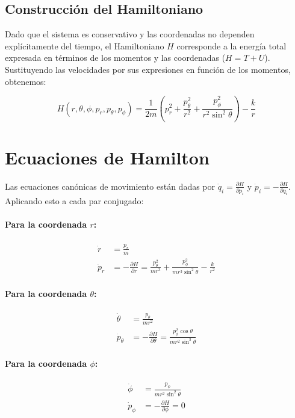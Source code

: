 \documentclass[12pt, a4paper]{article}
\begin{document}
\subsection*{Construcción del Hamiltoniano}

Dado que el sistema es conservativo y las coordenadas no dependen explícitamente del tiempo, el Hamiltoniano $H$ corresponde a la energía total expresada en términos de los momentos y las coordenadas ($H = T + U$).
Sustituyendo las velocidades por sus expresiones en función de los momentos, obtenemos:

\begin{equation}
    H(r, \theta, \phi, p_r, p_\theta, p_\phi) = \frac{1}{2m}\left( p_r^2 + \frac{p_\theta^2}{r^2} + \frac{p_\phi^2}{r^2\sin^2\theta} \right) - \frac{k}{r}
\end{equation}

\section*{Ecuaciones de Hamilton}

Las ecuaciones canónicas de movimiento están dadas por $\dot{q}_i = \frac{\partial H}{\partial p_i}$ y $\dot{p}_i = -\frac{\partial H}{\partial q_i}$. Aplicando esto a cada par conjugado:

\paragraph{Para la coordenada $r$:}
\begin{align}
    \dot{r} &= \frac{p_r}{m} \\
    \dot{p}_r &= -\frac{\partial H}{\partial r} = \frac{p_\theta^2}{mr^3} + \frac{p_\phi^2}{mr^3\sin^2\theta} - \frac{k}{r^2}
\end{align}

\paragraph{Para la coordenada $\theta$:}
\begin{align}
    \dot{\theta} &= \frac{p_\theta}{mr^2} \\
    \dot{p}_\theta &= -\frac{\partial H}{\partial \theta} = \frac{p_\phi^2 \cos\theta}{mr^2\sin^3\theta}
\end{align}

\paragraph{Para la coordenada $\phi$:}
\begin{align}
    \dot{\phi} &= \frac{p_\phi}{mr^2\sin^2\theta} \\
    \dot{p}_\phi &= -\frac{\partial H}{\partial \phi} = 0 \label{eq:p_phi_dot}
\end{align}
\end{document}
